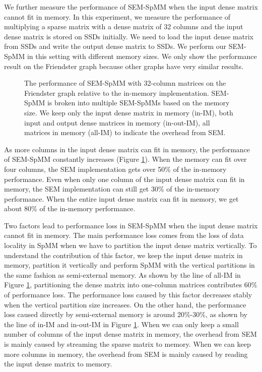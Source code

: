 We further measure the performance of SEM-SpMM when the input dense matrix
cannot fit in memory. In this experiment, we
measure the performance of multiplying a sparse matrix with a dense matrix
of 32 columns and the input dense matrix is stored on SSDs initially.
We need to load the input dense matrix from SSDs and write the output dense
matrix to SSDs. We perform our SEM-SpMM in this setting with different memory
sizes. We only show the performance result on the Friendster graph because
other graphs have very similar results.

\begin{figure}
	\begin{center}
		\footnotesize
		
		\caption{The performance of SEM-SpMM with 32-column matrices on
			the Friendster graph relative to the in-memory implementation.
			SEM-SpMM is broken into multiple SEM-SpMMs based on the memory
			size. We keep only the input dense matrix in memory (in-IM),
			both input and output dense matrices in memory (in-out-IM),
			all matrices in memory (all-IM) to indicate the overhead from SEM.}
		\label{perf:spmm32}
	\end{center}
\end{figure}

As more columns in the input dense matrix can fit in memory, the performance
of SEM-SpMM constantly increases (Figure \ref{perf:spmm32}). When the memory
can fit over four columns, the SEM implementation gets over 50\% of
the in-memory performance. Even when only one column of the input dense matrix
can fit in memory, the SEM implementation can still get 30\% of the in-memory
performance. When the entire input dense matrix can fit in memory, we get about
80\% of the in-memory performance.

Two factors lead to performance loss in SEM-SpMM when the input dense matrix
cannot fit in memory. The main performance loss comes from the loss of data
locality in SpMM when we have to partition the input dense matrix vertically.
To understand
the contribution of this factor, we keep the input dense matrix in memory,
partition it vertically and perform SpMM with the vertical partitions in
the same fashion as semi-external memory. As shown by the line of all-IM
in Figure \ref{perf:spmm32},
partitioning the dense matrix into one-column matrices contributes 60\%
of performance loss. The performance loss caused by this factor decreases
stably when the vertical partition size increases. On the other hand,
the performance loss caused directly by semi-external memory is around 20\%-30\%,
as shown by the line of in-IM and in-out-IM in Figure \ref{perf:spmm32}.
When we can only
keep a small number of columns of the input dense matrix in memory, the overhead
from SEM is mainly caused by streaming the sparse matrix to memory. When we can
keep more columns in memory, the overhead from SEM is mainly caused by reading
the input dense matrix to memory.

